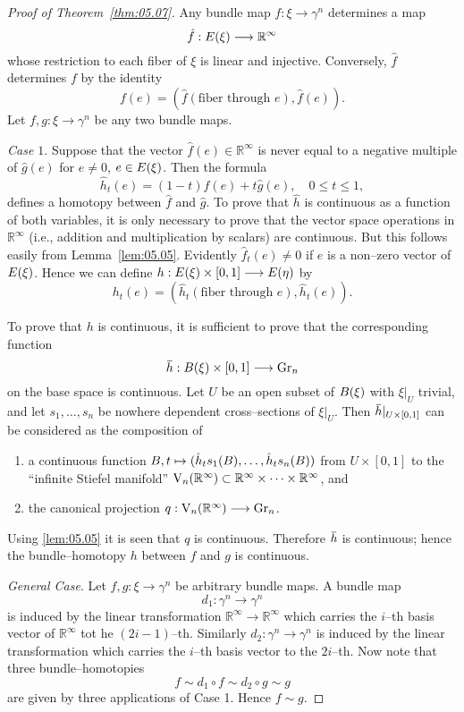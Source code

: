 \documentclass[../main]{subfiles}
\begin{document}
\begin{proof}[Proof of Theorem~\ref{thm:05.07}]
Any bundle map $f : \xi \longrightarrow \gamma^n$ determines a map \[\hat f : E(\xi) \longrightarrow {\mathbb R}^\infty\] whose restriction to each fiber of $\xi$ is linear and injective. Conversely, $\hat f$ determines $f$ by the identity \[f(e) = ({\hat f}(\text{fiber through } e), {\hat f}(e)).\] Let $f, g : \xi \longrightarrow \gamma^n$ be any two bundle maps. 

\emph{Case $1$}. Suppose that the vector ${\hat f}(e) \in {\mathbb R}^\infty$ is never equal to a negative multiple of ${\hat g}(e)$ for $e \ne 0$, $e \in E(\xi)$. Then the formula \[{\hat h}_t(e) = (1 - t) {\hat f}(e) + t {\hat g}(e), \quad 0 \le t \le 1,\] defines a homotopy between ${\hat f}$ and ${\hat g}$. To prove that $\hat h$ is continuous as a function of both variables, it is only necessary to prove that the vector space operations in ${\mathbb R}^\infty$ (i.e., addition and multiplication by scalars) are continuous. But this follows easily from Lemma~\ref{lem:05.05}. Evidently ${\hat f}_t(e) \ne 0$ if $e$ is a non--zero vector of $E(\xi)$. Hence we can define $h : E(\xi) \times [0, 1] \longrightarrow E(\eta)$ by \[h_t(e) = ({\hat h}_t(\text{fiber through } e), {\hat h}_t(e)).\] 

To prove that $h$ is continuous, it is sufficient to prove that the corresponding function \[\xoverline h : \base(\xi) \times [0, 1] \longrightarrow \grassmannian_n\] on the base space is continuous. Let $U$ be an open subset of $B(\xi)$ with $\xi |_U$ trivial, and let $s_1, \ldots, s_n$ be nowhere dependent cross--sections of $\xi |_U$. Then $\xoverline h |_{U \times [0,1]}$ can be considered as the composition of
\begin{enumerate}[label=\arabic*)]
    \item a continuous function $B, t \mapsto ({\hat h}_t s_1(B), \ldots, {\hat h}_t s_n(B))$ from $U \times [0, 1]$ to the ``infinite Stiefel manifold'' $\operatorname{V}_n({\mathbb R}^\infty) \subset {\mathbb R}^\infty \times \cdots \times {\mathbb R}^\infty$, and
    \item the canonical projection $q : \operatorname{V}_n({\mathbb R}^\infty) \longrightarrow \operatorname{Gr}_n$.
\end{enumerate} 
Using \ref{lem:05.05} it is seen that $q$ is continuous. Therefore $\xoverline h$ is continuous; hence the bundle--homotopy $h$ between $f$ and $g$ is continuous. 

\emph{General Case}. Let $f, g : \xi \longrightarrow \gamma^n$ be arbitrary bundle maps. A bundle map \[d_1 : \gamma^n \longrightarrow \gamma^n\] is induced by the linear transformation ${\mathbb R}^\infty \longrightarrow {\mathbb R}^\infty$ which carries the $i$--th basis vector of ${\mathbb R}^\infty$ tot he $(2 i - 1)$--th. Similarly $d_2 : \gamma^n \longrightarrow \gamma^n$ is induced by the linear transformation which carries the $i$--th basis vector to the $2i$--th. Now note that three bundle--homotopies \[f \sim d_1 \circ f \sim d_2 \circ g \sim g\] are given by three applications of Case 1. Hence $f \sim g$.
\end{proof}
\end{document}
